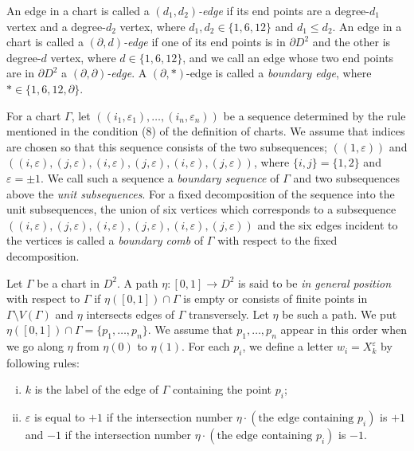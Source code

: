 \documentclass{amsart}
\theoremstyle{plain}
\theoremstyle{definition}
\begin{document}
\par

An edge in a chart is called a {\it $(d_1,d_2)$-edge} if its end points are a degree-$d_1$ vertex and a degree-$d_2$ vertex, where $d_1,d_2\in\{1,6,12\}$ and $d_1\leq d_2$. 
An edge in a chart is called a {\it $(\partial,d)$-edge} if one of its end points is in $\partial D^2$ and the other is degree-$d$ vertex, where $d\in\{1,6,12\}$, 
and we call an edge whose two end points are in $\partial D^2$ a {\it $(\partial,\partial)$-edge}. 
A $(\partial,\ast)$-edge is called a {\it boundary edge}, where $\ast\in\{1,6,12,\partial\}$. 

\par

For a chart $\Gamma$, let $((i_1,\varepsilon_1),\ldots,(i_n,\varepsilon_n))$ be a sequence determined by the rule mentioned in the condition (8) of the definition of charts. 
We assume that indices are chosen so that this sequence consists of the two subsequences; 
$((1,\varepsilon))$ and $((i,\varepsilon),(j,\varepsilon),(i,\varepsilon),(j,\varepsilon),(i,\varepsilon),(j,\varepsilon))$, where $\{i,j\}=\{1,2\}$ and $\varepsilon=\pm 1$. 
We call such a sequence a {\it boundary sequence} of $\Gamma$ and two subsequences above the {\it unit subsequences}. 
For a fixed decomposition of the sequence into the unit subsequences, 
the union of six vertices which corresponds to a subsequence $((i,\varepsilon),(j,\varepsilon),(i,\varepsilon),(j,\varepsilon),(i,\varepsilon),(j,\varepsilon))$ and the six edges incident to the vertices is called a {\it boundary comb} of $\Gamma$ with respect to the fixed decomposition. 


\par

Let $\Gamma$ be a chart in $D^2$. 
A path $\eta:[0,1]\rightarrow D^2$ is said to be {\it in general position} with respect to $\Gamma$ 
if $\eta([0,1])\cap\Gamma$ is empty or consists of finite points in $\Gamma\setminus V(\Gamma)$ and $\eta$ intersects edges of $\Gamma$ transversely. 
Let $\eta$ be such a path. 
We put $\eta([0,1])\cap\Gamma=\{p_1,\ldots,p_n\}$. 
We assume that $p_1,\ldots,p_n$ appear in this order when we go along $\eta$ from $\eta(0)$ to $\eta(1)$. 
For each $p_i$, we define a letter $w_i=X_k^\varepsilon$ by following rules: 

\begin{enumerate}[(i)]

\item $k$ is the label of the edge of $\Gamma$ containing the point $p_i$; 

\item $\varepsilon$ is equal to $+1$ if the intersection number $\eta\cdot(\text{the edge containing }p_i)$ is $+1$ and $-1$ if the intersection number $\eta\cdot(\text{the edge containing }p_i)$ is $-1$.

\end{enumerate}
\end{document}
